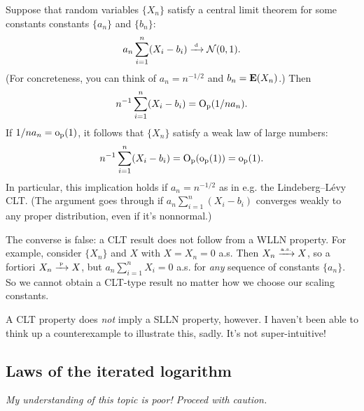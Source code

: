 \documentclass[11pt,letterpaper,reqno,oneside]{article}
\begin{document}
Suppose that random variables $\{ X_n \}$ satisfy a central limit theorem for some constants constants $\{ a_n \}$ and $\{ b_n \}$:
%
\begin{equation*}
	a_n \sum_{i=1}^n ( X_i - b_i ) \xrightarrow{{\scriptscriptstyle \mathrm{\;d\;}}} \mathcal{N}(0,1) .
\end{equation*}
%
(For concreteness, you can think of $a_n=n^{-1/2}$ and $b_n = \mathbf{E}(X_n)$.) Then
%
\begin{equation*}
	n^{-1} \sum_{i=1}^n (X_i-b_i) = \mathrm{O}_{\mathrm{p}}( 1 / n a_n) .
\end{equation*}
%
If $1/n a_n = \mathrm{o}_{\mathrm{p}}(1)$, it follows that $\{ X_n \}$ satisfy a weak law of large numbers:
%
\begin{equation*}
	 n^{-1} \sum_{i=1}^n (X_i-b_i) = \mathrm{O}_{\mathrm{p}}( \mathrm{o}_{\mathrm{p}}(1) ) = \mathrm{o}_{\mathrm{p}}(1) .
\end{equation*}
%
In particular, this implication holds if $a_n = n^{-1/2}$ as in e.g. the Lindeberg--Lévy CLT. (The argument goes through if $a_n \sum_{i=1}^n ( X_i - b_i )$ converges weakly to any proper distribution, even if it's nonnormal.)


The converse is false: a CLT result does not follow from a WLLN property. For example, consider $\{ X_n \}$ and $X$ with $X = X_n = 0$ a.s. Then $X_n \xrightarrow{{\scriptscriptstyle \mathrm{a.s.}}} X$, so a fortiori $X_n \xrightarrow{{\scriptscriptstyle \mathrm{\;p\;}}} X$, but $a_n \sum_{i=1}^n X_i = 0$ a.s. for \emph{any} sequence of constants $\{ a_n \}$. So we cannot obtain a CLT-type result no matter how we choose our scaling constants.

A CLT property does \emph{not} imply a SLLN property, however. I haven't been able to think up a counterexample to illustrate this, sadly. It's not super-intuitive!



\subsection{Laws of the iterated logarithm}
\label{sec:LIL:LIL}

\emph{My understanding of this topic is poor! Proceed with caution.}
\end{document}
